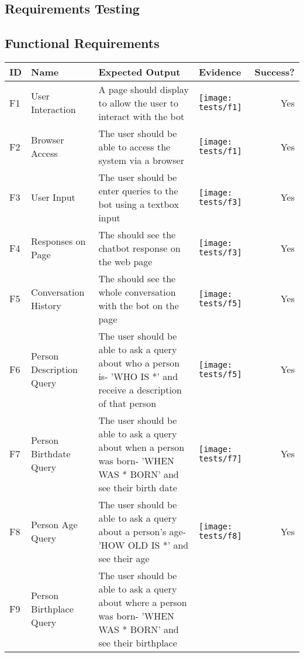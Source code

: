 \begin{landscape}
	\section{Requirements Testing}
	\label{sec:reqtesting}
	\subsection{Functional Requirements}
	\begin{tabularx}{\hsize}{lXXXr}
		\toprule
		ID & Name & Expected Output & Evidence & Success? \\
		\midrule
		F1 & User Interaction 
		& A page should display to allow the user to interact with the bot
		& \texttt{[image: tests/f1]} & Yes \\
		\midrule
		F2 & Browser Access
		& The user should be able to access the system via a browser
		& \texttt{[image: tests/f1]} & Yes \\
		\midrule
		F3 & User Input
		& The user should be enter queries to the bot using a textbox input
		& \texttt{[image: tests/f3]} & Yes \\
		\midrule
		F4 & Responses on Page
		& The should see the chatbot response on the web page
		& \texttt{[image: tests/f3]} & Yes \\
		\midrule
		F5 & Conversation History
		& The should see the whole conversation with the bot on the page
		& \texttt{[image: tests/f5]} & Yes \\
		\midrule
		F6 & Person Description Query
		& The user should be able to ask a query about who a person is\newline - 'WHO IS *' and receive a description of that person
		& \texttt{[image: tests/f5]} & Yes \\
		\midrule
		F7 & Person Birthdate Query
		& The user should be able to ask a query about when a person was born\newline - 'WHEN WAS * BORN' and see their birth date
		& \texttt{[image: tests/f7]} & Yes \\
		\midrule
		F8 & Person Age Query
		& The user should be able to ask a query about a person's age\newline - 'HOW OLD IS *' and see their age
		& \texttt{[image: tests/f8]} & Yes \\
		\midrule
		F9 & Person Birthplace Query
		& The user should be able to ask a query about where a person was born\newline - 'WHEN WAS * BORN' and see their birthplace

\end{tabularx}
\end{landscape}
